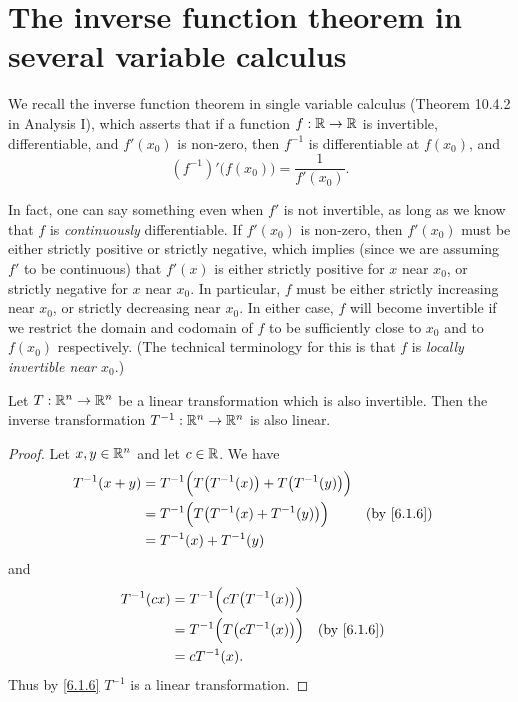 \section{The inverse function theorem in several variable calculus}\label{sec:6.7}

\begin{note}
  We recall the inverse function theorem in single variable calculus (Theorem 10.4.2 in Analysis I), which asserts that if a function \(f : \mathbb{R} \to \mathbb{R}\) is invertible, differentiable, and \(f'(x_0)\) is non-zero, then \(f^{-1}\) is differentiable at \(f(x_0)\), and
  \[
    (f^{-1})'\big(f(x_0)\big) = \dfrac{1}{f'(x_0)}.
  \]

  In fact, one can say something even when \(f'\) is not invertible, as long as we know that \(f\) is \emph{continuously} differentiable.
  If \(f'(x_0)\) is non-zero, then \(f'(x_0)\) must be either strictly positive or strictly negative, which implies (since we are assuming \(f'\) to be continuous) that \(f'(x)\) is either strictly positive for \(x\) near \(x_0\), or strictly negative for \(x\) near \(x_0\).
  In particular, \(f\) must be either strictly increasing near \(x_0\), or strictly decreasing near \(x_0\).
  In either case, \(f\) will become invertible if we restrict the domain and codomain of \(f\) to be sufficiently close to \(x_0\) and to \(f(x_0)\) respectively.
  (The technical terminology for this is that \(f\) is \emph{locally invertible near \(x_0\)}.)
\end{note}

\begin{lem}\label{6.7.1}
  Let \(T : \mathbb{R}^n \to \mathbb{R}^n\) be a linear transformation which is also invertible.
  Then the inverse transformation \(T^{-1} : \mathbb{R}^n \to \mathbb{R}^n\) is also linear.
\end{lem}

\begin{proof}
  Let \(x, y \in \mathbb{R}^n\) and let \(c \in \mathbb{R}\).
  We have
  \begin{align*}
    T^{-1}(x + y) & = T^{-1}\Big(T\big(T^{-1}(x)\big) + T\big(T^{-1}(y)\big)\Big)                 \\
                  & = T^{-1}\Big(T\big(T^{-1}(x) + T^{-1}(y)\big)\Big)            &  & \by{6.1.6} \\
                  & = T^{-1}(x) + T^{-1}(y)
  \end{align*}
  and
  \begin{align*}
    T^{-1}(cx) & = T^{-1}\Big(c T\big(T^{-1}(x)\big)\Big)                 \\
               & = T^{-1}\Big(T\big(c T^{-1}(x)\big)\Big) &  & \by{6.1.6} \\
               & = c T^{-1}(x).
  \end{align*}
  Thus by \cref{6.1.6} \(T^{-1}\) is a linear transformation.
\end{proof}

